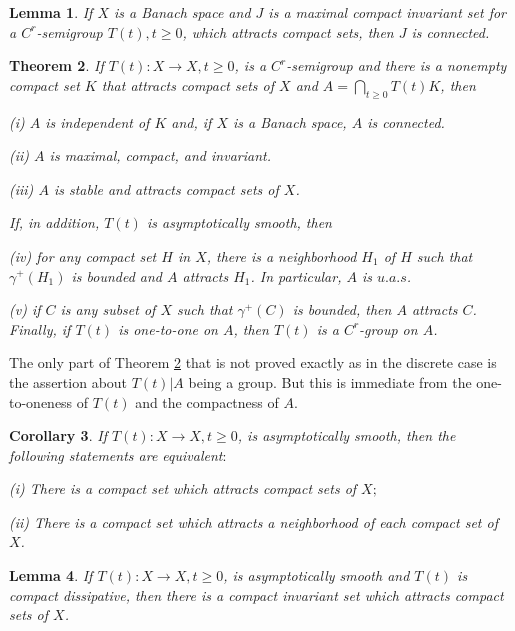 \documentclass{surv-l}
\theoremstyle{plain}
\newtheorem{theorem}{Theorem}[section]
\newtheorem{corollary}[theorem]{Corollary}
\newtheorem{lemma}[theorem]{Lemma}
\theoremstyle{definition}
\numberwithin{equation}{section}
\numberwithin{figure}{chapter}
\begin{document}
\begin{lemma}\label{lem3.4.1} If $X$ is a Banach space and $J$ is a maximal compact invariant set for a $C^{r}$-semigroup $T(t), t\geq 0$, which attracts compact sets, then $J$ is connected.
\end{lemma}

\begin{theorem}\label{thml3.4.2} If $T(t)\!:X\rightarrow X, t\geq 0$, is a $C^{r}$-semigroup and there is a nonempty compact set $K$ that attracts compact sets of $X$ and $A=\bigcap_{t\geq 0}T(t)K$, then

\emph{(i)} $A$ is independent of $K$ and, if $X$ is a Banach space, $A$ is connected.

\emph{(ii)} $A$ is maximal, compact, and invariant.

\emph{(iii)} $A$ is stable and attracts compact sets of $X$.

\noindent If, in addition, $T(t)$ is asymptotically smooth, then

\emph{(iv)} for any compact set $H$ in $X$, there is a neighborhood $H_{1}$ of $H$ such that $\gamma^{+}(H_{1})$ is bounded and $A$ attracts $H_{1}$. In particular, $A$ is $u.a.s$.

\emph{(v)} if $C$ is any subset of $X$ such that $\gamma^{+}(C)$ is bounded, then $A$ attracts $C$. Finally, if $T(t)$ is one-to-one on $A$, then $T(t)$ is a $C^{r}$-group on $A$.
\end{theorem}

The only part of Theorem \ref{thml3.4.2} that is not proved exactly as in the discrete case is the assertion about $T(t)|A$ being a group. But this is immediate from the one-to-oneness of $T(t)$ and the compactness of $A$.

\begin{corollary}\label{cor3.4.3} If $T(t)\!:X\rightarrow X, t\geq 0$, is asymptotically smooth, then the following statements are equivalent$:$

\emph{(i)} There is a compact set which attracts compact sets of $X;$

\emph{(ii)} There is a compact set which attracts a neighborhood of each compact set of $X$.
\end{corollary}

\begin{lemma}\label{lem3.4.4} If $T(t)\!:X\rightarrow X, t\geq 0$, is asymptotically smooth and $T(t)$ is compact dissipative, then there is a compact invariant set which attracts compact sets of $X$.
\end{lemma}
\end{document}
